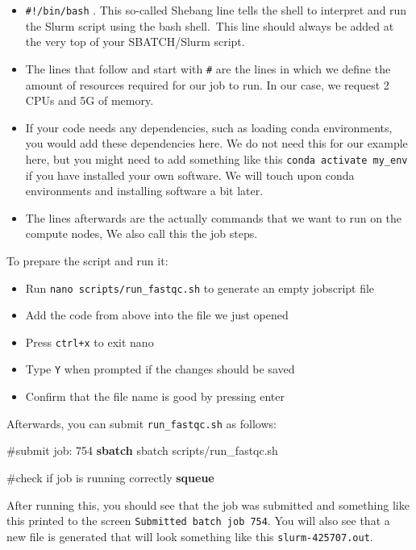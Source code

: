 \documentclass[
  letterpaper,
  DIV=11,
  numbers=noendperiod]{scrreprt}
\newenvironment{Shaded}{}{}
\newcommand{\CommentTok}[1]{\textcolor[rgb]{0.42,0.45,0.49}{#1}}
\newcommand{\ExtensionTok}[1]{\textcolor[rgb]{0.84,0.23,0.29}{\textbf{#1}}}
\newcommand{\NormalTok}[1]{\textcolor[rgb]{0.14,0.16,0.18}{#1}}
\providecommand{\tightlist}{%
  \setlength{\itemsep}{0pt}\setlength{\parskip}{0pt}}\usepackage{longtable,booktabs,array}
\begin{document}
\begin{itemize}
\item
  \texttt{\#!/bin/bash} . This so-called Shebang line tells the shell to
  interpret and run the Slurm script using the bash shell.~This line
  should always be added at the very top of your SBATCH/Slurm script.
\item
  The lines that follow and start with \texttt{\#} are the lines in
  which we define the amount of resources required for our job to run.
  In our case, we request 2 CPUs and 5G of memory.
\item
  If your code needs any dependencies, such as loading conda
  environments, you would add these dependencies here. We do not need
  this for our example here, but you might need to add something like
  this \texttt{conda\ activate\ my\_env} if you have installed your own
  software. We will touch upon conda environments and installing
  software a bit later.
\item
  The lines afterwards are the actually commands that we want to run on
  the compute nodes, We also call this the job steps.
\end{itemize}

To prepare the script and run it:

\begin{itemize}
\tightlist
\item
  Run \texttt{nano\ scripts/run\_fastqc.sh} to generate an empty
  jobscript file
\item
  Add the code from above into the file we just opened
\item
  Press \texttt{ctrl+x} to exit nano
\item
  Type \texttt{Y} when prompted if the changes should be saved
\item
  Confirm that the file name is good by pressing enter
\end{itemize}

Afterwards, you can submit \texttt{run\_fastqc.sh} as follows:

\begin{Shaded}
\begin{Highlighting}[]
\CommentTok{\#submit job: 754}
\ExtensionTok{sbatch}\NormalTok{ sbatch scripts/run\_fastqc.sh}

\CommentTok{\#check if job is running correctly}
\ExtensionTok{squeue}
\end{Highlighting}
\end{Shaded}

After running this, you should see that the job was submitted and
something like this printed to the screen
\texttt{Submitted\ batch\ job\ 754}. You will also see that a new file
is generated that will look something like this
\texttt{slurm-425707.out}.
\end{document}
